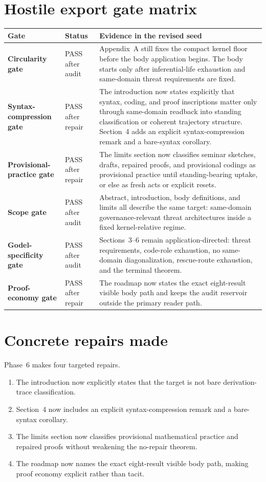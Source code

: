 \documentclass[11pt]{article}
\begin{document}
\section{Hostile export gate matrix}
\begin{center}
\begin{tabularx}{\textwidth}{>{\bfseries}p{} >{\raggedright\arraybackslash}p{} X}
\toprule
Gate & Status & Evidence in the revised seed \\
\midrule
Circularity gate & PASS after audit & Appendix~A still fixes the compact kernel floor before the body application begins. The body starts only after inferential-life exhaustion and same-domain threat requirements are fixed. \\
Syntax-compression gate & PASS after repair & The introduction now states explicitly that syntax, coding, and proof inscriptions matter only through same-domain readback into standing classification or coherent trajectory structure. Section~4 adds an explicit syntax-compression remark and a bare-syntax corollary. \\
Provisional-practice gate & PASS after repair & The limits section now classifies seminar sketches, drafts, repaired proofs, and provisional codings as provisional practice until standing-bearing uptake, or else as fresh acts or explicit resets. \\
Scope gate & PASS after audit & Abstract, introduction, body definitions, and limits all describe the same target: same-domain governance-relevant threat architectures inside a fixed kernel-relative regime. \\
Godel-specificity gate & PASS after audit & Sections~3--6 remain application-directed: threat requirements, code-role exhaustion, no same-domain diagonalization, rescue-route exhaustion, and the terminal theorem. \\
Proof-economy gate & PASS after repair & The roadmap now states the exact eight-result visible body path and keeps the audit reservoir outside the primary reader path. \\
\bottomrule
\end{tabularx}
\end{center}

\section{Concrete repairs made}
Phase~6 makes four targeted repairs.
\begin{enumerate}[leftmargin=2.2em]
    \item The introduction now explicitly states that the target is not bare derivation-trace classification.
    \item Section~4 now includes an explicit syntax-compression remark and a bare-syntax corollary.
    \item The limits section now classifies provisional mathematical practice and repaired proofs without weakening the no-repair theorem.
    \item The roadmap now names the exact eight-result visible body path, making proof economy explicit rather than tacit.
\end{enumerate}
\end{document}
